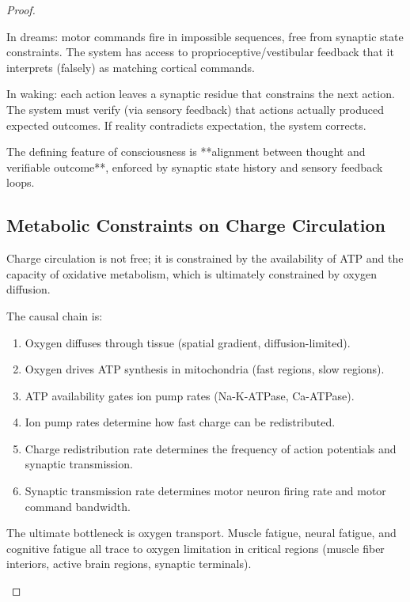 \begin{corollary}
\begin{proof}
\begin{principle}
In dreams: motor commands fire in impossible sequences, free from synaptic state constraints. The system has access to proprioceptive/vestibular feedback that it interprets (falsely) as matching cortical commands.

In waking: each action leaves a synaptic residue that constrains the next action. The system must verify (via sensory feedback) that actions actually produced expected outcomes. If reality contradicts expectation, the system corrects.

The defining feature of consciousness is **alignment between thought and verifiable outcome**, enforced by synaptic state history and sensory feedback loops.
\end{principle}

\subsection{Metabolic Constraints on Charge Circulation}
\label{subsec:metabolic-constraints}

Charge circulation is not free; it is constrained by the availability of ATP and the capacity of oxidative metabolism, which is ultimately constrained by oxygen diffusion.

\begin{principle}
\label{prin:oxygen-atp-charge}
The causal chain is:
\begin{enumerate}[label=(\arabic*), noitemsep]
\item Oxygen diffuses through tissue (spatial gradient, diffusion-limited).
\item Oxygen drives ATP synthesis in mitochondria (fast regions, slow regions).
\item ATP availability gates ion pump rates (Na-K-ATPase, Ca-ATPase).
\item Ion pump rates determine how fast charge can be redistributed.
\item Charge redistribution rate determines the frequency of action potentials and synaptic transmission.
\item Synaptic transmission rate determines motor neuron firing rate and motor command bandwidth.
\end{enumerate}

The ultimate bottleneck is oxygen transport. Muscle fatigue, neural fatigue, and cognitive fatigue all trace to oxygen limitation in critical regions (muscle fiber interiors, active brain regions, synaptic terminals).
\end{principle}


\end{proof}
\end{corollary}
